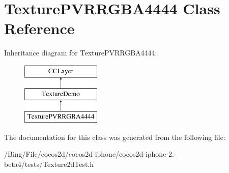 \hypertarget{interface_texture_p_v_r_r_g_b_a4444}{\section{Texture\-P\-V\-R\-R\-G\-B\-A4444 Class Reference}
\label{interface_texture_p_v_r_r_g_b_a4444}
}
Inheritance diagram for Texture\-P\-V\-R\-R\-G\-B\-A4444\-:\begin{figure}[H]
\begin{center}
\leavevmode
\includegraphics[height=3.000000cm]{interface_texture_p_v_r_r_g_b_a4444}
\end{center}
\end{figure}


The documentation for this class was generated from the following file\-:\begin{DoxyCompactItemize}
\item 
/\-Bing/\-File/cocos2d/cocos2d-\/iphone/cocos2d-\/iphone-\/2.-\/beta4/tests/Texture2d\-Test.\-h\end{DoxyCompactItemize}
